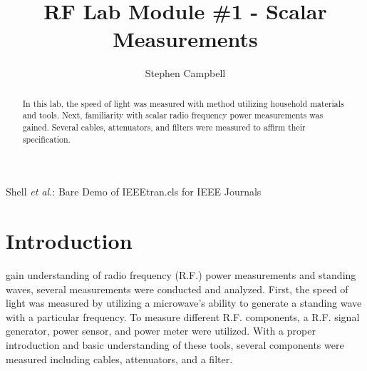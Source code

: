 \documentclass[journal]{IEEEtran}
\begin{document}
\title{RF Lab Module \#1 - Scalar Measurements} %

\author{ Stephen Campbell } 
    
        
{Shell \MakeLowercase{\textit{et al.}}: Bare Demo of IEEEtran.cls for IEEE Journals}

\maketitle

\begin{abstract}
In this lab, the speed of light was measured with method utilizing household materials and tools.
Next, familiarity with scalar radio frequency power measurements was gained. Several cables, attenuators,
and filters were measured to affirm their specification.
\end{abstract}


\section{Introduction}

 gain understanding of radio frequency (R.F.) power measurements and standing
waves, several measurements were conducted and analyzed. First, the speed of light was measured by utilizing 
a microwave's ability to generate a standing wave with a particular frequency. To measure 
different R.F. components, a  R.F. signal generator, power sensor, and power meter were utilized.
With a proper introduction and basic understanding of these tools, several components were measured
including cables, attenuators, and a filter.
\end{document}
